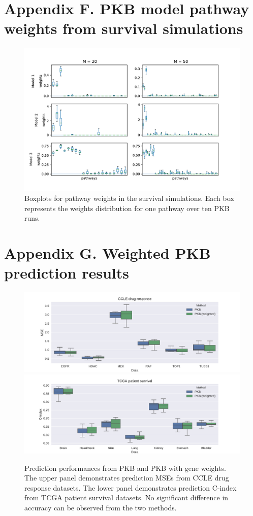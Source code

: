 \documentclass[a4paper,12pt]{article}
\begin{document}
\section*{Appendix F. PKB model pathway weights from survival simulations}
\label{sec:surv_weights}
\begin{figure}[htp]
	\centering
	\includegraphics[width=1\textwidth]{simu_surv_weights.pdf}
	\caption{Boxplots for pathway weights in the survival simulations. Each box represents the weights distribution for one pathway over ten PKB runs.}
\end{figure}
\newpage
\section*{Appendix G. Weighted PKB prediction results}
\label{sec:weightedPKB}

\begin{figure}[htp]
	\centering
	\includegraphics[width=1\textwidth]{reg_W_vs_noW.pdf}\\ \vspace{-3mm}
	\includegraphics[width=1\textwidth]{surv_W_vs_noW.pdf}
	\caption{Prediction performances from PKB and PKB with gene weights. The upper panel demonstrates prediction MSEs from CCLE drug response datasets. The lower panel demonstrates prediction C-index from TCGA patient survival datasets. No significant difference in accuracy can be observed from the two methods.}
\end{figure}
\newpage
\end{document}
